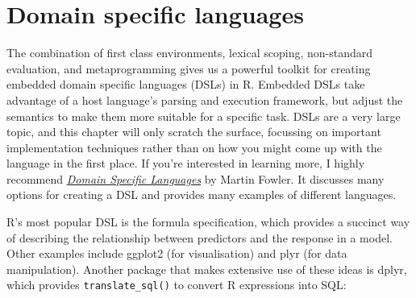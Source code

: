 \chapter{Domain specific languages}\label{dsl}

The combination of first class environments, lexical scoping,
non-standard evaluation, and metaprogramming gives us a powerful toolkit
for creating embedded domain specific languages (DSLs) in R. Embedded
DSLs take advantage of a host language's parsing and execution
framework, but adjust the semantics to make them more suitable for a
specific task. DSLs are a very large topic, and this chapter will only
scratch the surface, focussing on important implementation techniques
rather than on how you might come up with the language in the first
place. If you're interested in learning more, I highly recommend
\href{http://amzn.com/0321712943?tag=devtools-20}{\emph{Domain Specific
Languages}} by Martin Fowler. It discusses many options for creating a
DSL and provides many examples of different languages.

R's most popular DSL is the formula specification, which provides a
succinct way of describing the relationship between predictors and the
response in a model. Other examples include ggplot2 (for visualisation)
and plyr (for data manipulation). Another package that makes extensive
use of these ideas is dplyr, which provides \texttt{translate\_sql()} to
convert R expressions into SQL:

\begin{Shaded}
\end{Shaded}

